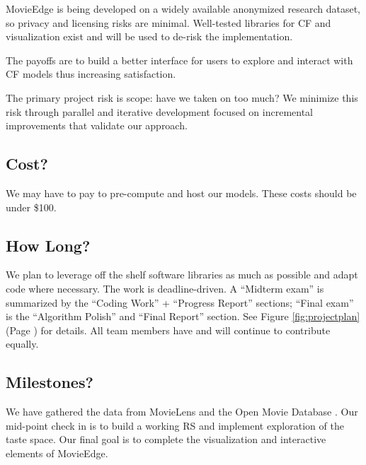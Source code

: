 MovieEdge is being developed on a widely available anonymized research dataset, so privacy and licensing risks are minimal. Well-tested libraries for CF and visualization exist and will be used to de-risk the implementation. 

The payoffs are to build a better interface for users to explore and interact with CF models thus increasing satisfaction. 

The primary project risk is scope: have we taken on too much?   We minimize this risk through parallel and iterative development focused on incremental improvements that validate our approach.

\subsection{Cost?}
We may have to pay to pre-compute and host our models. These costs should be under \$100.

\subsection{How Long?}
We plan to leverage off the shelf software libraries as much as possible and adapt code where necessary. The work is deadline-driven.  A “Midterm exam” is summarized by the “Coding Work” + “Progress Report” sections; “Final exam” is the “Algorithm Polish” and “Final Report” section.  See Figure \ref{fig:projectplan}  (Page \pageref{fig:projectplan}) for details.  All team members have and will continue to contribute equally.

\subsection{Milestones?}
We have gathered the data from MovieLens \cite{harper2016movielens} and the Open Movie Database \cite{openMovieDB}. Our mid-point check in is to build a working RS and implement exploration of the taste space. Our final goal is to complete the visualization and interactive elements of MovieEdge.

